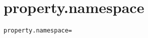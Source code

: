 \section{property.namespace}
\label{configuration:PropertyNamespace}
\ClearAPI
\TODO
\begin{lstlisting}[style=Props,caption={Usage example for \textit{property.namespace}}]
property.namespace=
\end{lstlisting}